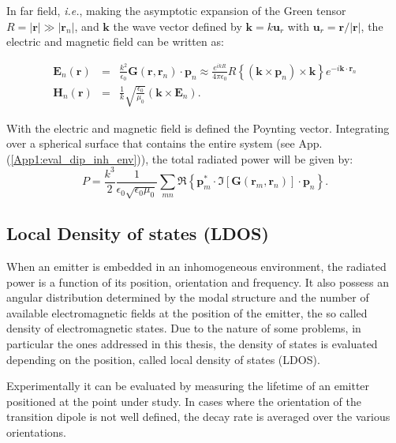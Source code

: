 In far field, \textit{i.e.}, making the asymptotic expansion of the Green tensor $R = \left|\mathbf{r}\right| \gg \left|\mathbf{r}_{n}\right|$, and $\mathbf{k}$ the wave vector defined by $\mathbf{k}=k \mathbf{u}_{r}$ with $\mathbf{u}_{r}={\mathbf{r}}/{\left|\mathbf{r}\right|}$, the electric and magnetic field can be written as:

\begin{eqnarray}
\mathbf{E}_{n}\left(\mathbf{r}\right) & = & \frac{k^{2}}{\epsilon_{0}}\mathbf{G}\left(\mathbf{r},\mathbf{r}_{n}\right)\cdot\mathbf{p}_{n}\approx\frac{e^{ikR}}{4\pi\epsilon_{0}} R \left\{ \left(\mathbf{k}\times\mathbf{p}_{n}\right)\times\mathbf{k}\right\} e^{-i\mathbf{k}\cdot\mathbf{r}_{n}}\\
\mathbf{H}_{n}\left(\mathbf{r}\right) & = & \frac{1}{k}\sqrt{\frac{\epsilon_{0}}{\mu_{0}}}\left(\mathbf{k}\times\mathbf{E}_{n}\right).
\end{eqnarray}


With the electric and magnetic field is defined the Poynting vector. Integrating over a spherical surface that contains the entire system (see App. (\ref{App1:eval_dip_inh_env})), the total radiated power will be given by:
\begin{equation}
P = \frac{k^3}{2}\frac{1}{\epsilon_{0}\sqrt{\epsilon_{0} \mu_{0}}} \sum_{mn}\Re \left\{ \mathbf{p}_{m}^{*}\cdot \Im \left[ \mathbf{G} \left(\mathbf{r}_{m},\mathbf{r}_{n}\right)\right]\cdot \mathbf{p}_{n} \right\}.
\end{equation} 


\subsection{Local Density of states (LDOS)}

When an emitter is embedded in an inhomogeneous environment, the radiated power is a function of its position, orientation and frequency. It also possess an angular distribution determined by the modal structure and the number of available electromagnetic fields at the position of the emitter, the so called density of electromagnetic states. Due to the nature of some problems, in particular the ones addressed in this thesis, the density of states is evaluated depending on the position, called local density of states (LDOS).

Experimentally it can be evaluated by measuring the lifetime of an emitter positioned at the point under study.
In cases where the orientation of the transition dipole is not well defined, the decay rate is averaged over the various orientations.

